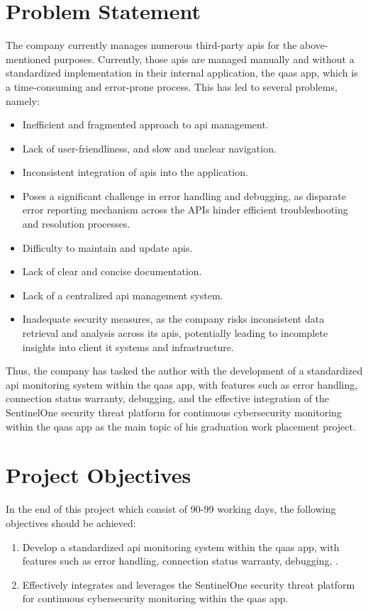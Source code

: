 \begin{multicols}{2}
      \section{Problem Statement}
      The company currently manages numerous third-party \acrshort{api}s for the above-mentioned purposes.
      Currently, those \acrshort{api}s are managed manually and without a standardized implementation in their
      internal application, the \acrshort{qaas} app, which is a time-consuming and error-prone process. This has
      led to several problems, namely:
      \begin{itemize}
            \item Inefficient and fragmented approach to \acrshort{api} management.
            \item Lack of user-friendliness, and slow and unclear navigation.
            \item Inconsistent integration of \acrshort{api}s into the application.
            \item Poses a significant challenge in error handling and debugging, as disparate error reporting
                  mechanism across the APIs hinder efficient troubleshooting and resolution processes.
            \item Difficulty to maintain and update \acrshort{api}s.
            \item Lack of clear and concise documentation.
            \item Lack of a centralized \acrshort{api} management system.
            \item Inadequate security measures, as the company risks inconsistent data retrieval and analysis
                  across its \acrshort{api}s, potentially leading to incomplete insights into client \acrshort{it}
                  systems and infrastructure.
      \end{itemize}
      Thus, the company has tasked the author with the development of a standardized \acrshort{api} monitoring
      system within the \acrshort{qaas} app, with features such as error handling, connection status warranty,
      debugging, and the effective integration of the SentinelOne security threat platform for continuous
      cybersecurity monitoring within the \acrshort{qaas} app as the main topic of his graduation work placement
      project.

      \section{Project Objectives}
      In the end of this project which consist of 90-99 working days, the following objectives should be achieved:
      \begin{enumerate}
            \item Develop a standardized \acrshort{api} monitoring system within the \acrshort{qaas} app, with
                  features such as error handling, connection status warranty, debugging, .
            \item Effectively integrates and leverages the SentinelOne security threat platform for continuous
                  cybersecurity monitoring within the \acrshort{qaas} app.
      \end{enumerate}

\end{multicols}
